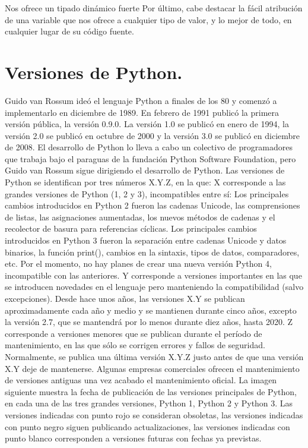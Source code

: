 \documentclass[12pt]{article}
\begin{document}
Nos ofrece un tipado dinámico fuerte
Por último, cabe destacar la fácil atribución de una variable que nos ofrece a cualquier tipo de valor, y lo mejor de todo, en cualquier lugar de su código fuente.
\cite{BeJobWebSite}


\section{Versiones de Python.}

Guido van Rossum ideó el lenguaje Python a finales de los 80 y comenzó a implementarlo en diciembre de 1989. En febrero de 1991 publicó la primera versión pública, la versión 0.9.0. La versión 1.0 se publicó en enero de 1994, la versión 2.0 se publicó en octubre de 2000 y la versión 3.0 se publicó en diciembre de 2008. El desarrollo de Python lo lleva a cabo un colectivo de programadores que trabaja bajo el paraguas de la fundación Python Software Foundation, pero Guido van Rossum sigue dirigiendo el desarrollo de Python.
Las versiones de Python se identifican por tres números X.Y.Z, en la que:
X corresponde a las grandes versiones de Python (1, 2 y 3), incompatibles entre sí:
Los principales cambios introducidos en Python 2 fueron las cadenas Unicode, las comprensiones de listas, las asignaciones aumentadas, los nuevos métodos de cadenas y el recolector de basura para referencias cíclicas.
Los principales cambios introducidos en Python 3 fueron la separación entre cadenas Unicode y datos binarios, la función print(), cambios en la sintaxis, tipos de datos, comparadores, etc.
Por el momento, no hay planes de crear una nueva versión Python 4, incompatible con las anteriores.
Y corresponde a versiones importantes en las que se introducen novedades en el lenguaje pero manteniendo la compatibilidad (salvo excepciones).
Desde hace unos años, las versiones X.Y se publican aproximadamente cada año y medio y se mantienen durante cinco años, excepto la versión 2.7, que se mantendrá por lo menos durante diez años, hasta 2020.
Z corresponde a versiones menores que se publican durante el período de mantenimiento, en las que sólo se corrigen errores y fallos de seguridad.
Normalmente, se publica una última versión X.Y.Z justo antes de que una versión X.Y deje de mantenerse. Algunas empresas comerciales ofrecen el mantenimiento de versiones antiguas una vez acabado el mantenimiento oficial.
La imagen siguiente muestra la fecha de publicación de las versiones principales de Python, en cada una de las tres grandes versiones, Python 1, Python 2 y Python 3. Las versiones indicadas con punto rojo se consideran obsoletas, las versiones indicadas con punto negro siguen publicando actualizaciones, las versiones indicadas con punto blanco corresponden a versiones futuras con fechas ya previstas.
\end{document}

